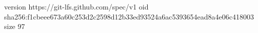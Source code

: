version https://git-lfs.github.com/spec/v1
oid sha256:f1cbeee673a60c253d2c2598d12b33ed93524a6ac5393654ead8a4e06c418003
size 97
